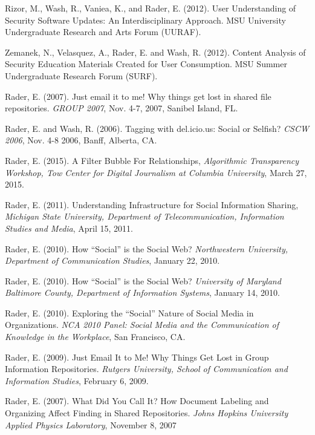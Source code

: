 \documentclass[9pt]{extarticle}
\makeatletter
\renewcommand{\section}{%
  \@startsection{section}{1}{0em}{\baselineskip}{3pt}{\large\bfseries\textsc}}
\makeatother
\begin{document}
Rizor, M., Wash, R., Vaniea, K., and Rader, E. (2012). User Understanding of Security Software Updates: An Interdisciplinary Approach. MSU University Undergraduate Research and Arts Forum (UURAF).

Zemanek, N., Velasquez, A., Rader, E. and Wash, R. (2012). Content Analysis of Security Education Materials Created for User Consumption. MSU Summer Undergraduate Research Forum (SURF).
  
Rader, E. (2007). Just email it to me! Why things get lost in shared file repositories. \emph{GROUP 2007}, Nov. 4-7, 2007, Sanibel Island, FL.

Rader, E. and Wash, R. (2006). Tagging with del.icio.us: Social or Selfish? \emph{CSCW 2006}, Nov. 4-8 2006, Banff, Alberta, CA.
 

\section{External Presentations}

Rader, E. (2015). A Filter Bubble For Relationships, \emph{Algorithmic Transparency Workshop, Tow Center for Digital Journalism at Columbia University}, March 27, 2015.

Rader, E. (2011). Understanding Infrastructure for Social Information Sharing, \emph{Michigan State University, Department of Telecommunication, Information Studies and Media}, April 15, 2011.

Rader, E. (2010). How ``Social'' is the Social Web? \emph{Northwestern University, Department of Communication Studies}, January 22, 2010.

Rader, E. (2010). How ``Social'' is the Social Web? \emph{University of Maryland Baltimore County, Department of Information Systems}, January 14, 2010.

Rader, E. (2010). Exploring the ``Social'' Nature of Social Media in Organizations. \emph{NCA 2010 Panel: Social Media and the Communication of Knowledge in the Workplace}, San Francisco, CA.

Rader, E. (2009). Just Email It to Me! Why Things Get Lost in Group Information Repositories. \emph{Rutgers University, School of Communication and Information Studies}, February 6, 2009.

Rader, E. (2007). What Did You Call It? How Document Labeling and Organizing Affect Finding in Shared Repositories. \emph{Johns Hopkins University Applied Physics Laboratory}, November 8, 2007
\end{document}

